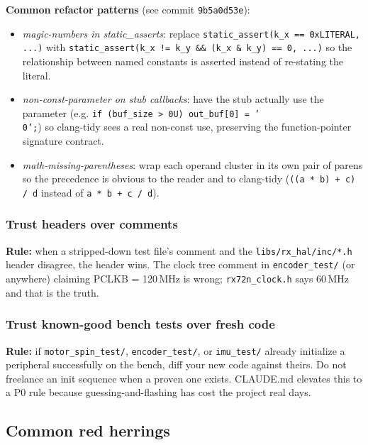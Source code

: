 \textbf{Common refactor patterns} (see commit \texttt{9b5a0d53e}):
\begin{itemize}
\item \emph{magic-numbers in static\_asserts}: replace
      \texttt{static\_assert(k\_x == 0xLITERAL, ...)} with
      \texttt{static\_assert(k\_x != k\_y \&\& (k\_x \& k\_y) == 0, ...)}
      so the relationship between named constants is asserted instead
      of re-stating the literal.
\item \emph{non-const-parameter on stub callbacks}: have the stub
      actually use the parameter (e.g.
      \texttt{if (buf\_size > 0U) out\_buf[0] = '\\0';}) so clang-tidy
      sees a real non-const use, preserving the function-pointer
      signature contract.
\item \emph{math-missing-parentheses}: wrap each operand cluster in
      its own pair of parens so the precedence is obvious to the
      reader and to clang-tidy
      (\texttt{((a * b) + c) / d} instead of \texttt{a * b + c / d}).
\end{itemize}

\subsubsection{Trust headers over comments}

\textbf{Rule:} when a stripped-down test file's comment and the
\texttt{libs/rx\_hal/inc/*.h} header disagree, the header wins. The
clock tree comment in \texttt{encoder\_test/} (or anywhere)
claiming PCLKB = 120\,MHz is wrong; \texttt{rx72n\_clock.h} says
60\,MHz and that is the truth.

\subsubsection{Trust known-good bench tests over fresh code}

\textbf{Rule:} if \texttt{motor\_spin\_test/}, \texttt{encoder\_test/},
or \texttt{imu\_test/} already initialize a peripheral successfully
on the bench, diff your new code against theirs. Do not freelance
an init sequence when a proven one exists. CLAUDE.md elevates this
to a P0 rule because guessing-and-flashing has cost the project
real days.

\subsection{Common red herrings}

